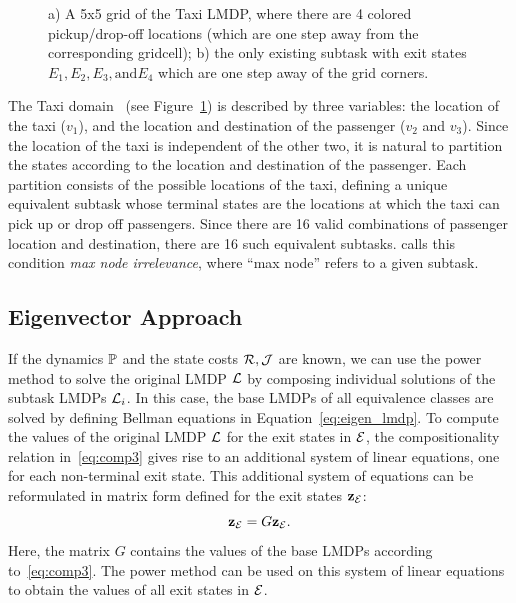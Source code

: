 \begin{figure}[!t]
    \begin{center}
        
    \end{center}
    \caption{a) A 5x5 grid of the Taxi LMDP, where there are 4 colored pickup/drop-off locations (which are one step away from the corresponding gridcell); b) the only existing subtask with exit states $E_1,E_2,E_3, \text{and} E_4$ which are one step away of the grid corners.} 
    \label{fig:domain_taxi}
\end{figure}
    

\begin{example}[Example 2] The Taxi domain~\citep{Dietterich2000} (see Figure~\ref{fig:domain_taxi}) is described by three variables: the location of the taxi ($v_1$), and the location and destination of the passenger ($v_2$ and $v_3$). Since the location of the taxi is independent of the other two, it is natural to partition the states according to the location and destination of the passenger. Each partition consists of the possible locations of the taxi, defining a unique equivalent subtask whose terminal states are the locations at which the taxi can pick up or drop off passengers. Since there are 16 valid combinations of passenger location and destination, there are 16 such equivalent subtasks.
\citep{Dietterich2000} calls this condition {\em max node irrelevance}, where ``max node'' refers to a given subtask.
\end{example}
\subsection{Eigenvector Approach}
\label{section:hlmdps_eigenvector_episodic}

If the dynamics $\mathbb{P}$ and the state costs $\mathcal{R}, \mathcal{J}$ are known, we can use the power method to solve the original LMDP $\mathcal{L}$ by composing individual solutions of the subtask LMDPs $\mathcal{L}_i$.
In this case, the base LMDPs of all equivalence classes are solved by defining Bellman equations in Equation~\eqref{eq:eigen_lmdp}.
To compute the values of the original LMDP $\mathcal{L}$ for the exit states in $\mathcal{E}$, the compositionality relation in~\eqref{eq:comp3} gives rise to an additional system of linear equations, one for each non-terminal exit state. This additional system of equations can be reformulated in matrix form defined for the exit states ${\bf z}_{\mathcal{E}}$:
\begin{equation}\label{eq:exits}
{\bf z}_{\mathcal{E}}=G{\bf z}_{\mathcal{E}}.
\end{equation}
Here, the matrix $G$ contains the values of the base LMDPs according to~\eqref{eq:comp3}.
The power method can be used on this system of linear equations to obtain the values of all exit states in $\mathcal{E}$.

